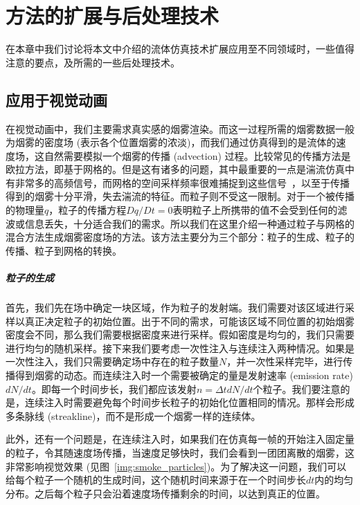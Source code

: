 \chapter{方法的扩展与后处理技术}
\label{chap:caa}

在本章中我们讨论将本文中介绍的流体仿真技术扩展应用至不同领域时，一些值得注意的要点，及所需的一些后处理技术。

\section{应用于视觉动画}
在视觉动画中，我们主要需求真实感的烟雾渲染。而这一过程所需的烟雾数据一般为烟雾的密度场 (表示各个位置烟雾的浓淡)，而我们通过仿真得到的是流体的速度场，这自然需要模拟一个烟雾的传播 (advection) 过程。比较常见的传播方法是欧拉方法，即基于网格的。但是这有诸多的问题，其中最重要的一点是湍流仿真中有非常多的高频信号，而网格的空间采样频率很难捕捉到这些信号~\cite{bridson2015fluid}，以至于传播得到的烟雾十分平滑，失去湍流的特征。而粒子则不受这一限制。对于一个被传播的物理量$q$，粒子的传播方程$Dq/Dt=0$表明粒子上所携带的值不会受到任何的滤波或信息丢失，十分适合我们的需求。所以我们在这里介绍一种通过粒子与网格的混合方法生成烟雾密度场的方法。该方法主要分为三个部分：粒子的生成、粒子的传播、粒子到网格的转换。

\paragraph{粒子的生成}
首先，我们先在场中确定一块区域，作为粒子的发射端。我们需要对该区域进行采样以真正决定粒子的初始位置。出于不同的需求，可能该区域不同位置的初始烟雾密度会不同，那么我们需要根据密度来进行采样。假如密度是均匀的，我们只需要进行均匀的随机采样。接下来我们要考虑一次性注入与连续注入两种情况。如果是一次性注入，我们只需要确定场中存在的粒子数量$N$，并一次性采样完毕，进行传播得到烟雾的动态。而连续注入时一个需要被确定的量是发射速率 (emission rate) $dN/dt$。即每一个时间步长，我们都应该发射$n=\Delta t dN/dt$个粒子。我们要注意的是，连续注入时需要避免每个时间步长粒子的初始化位置相同的情况。那样会形成多条脉线 (streakline)，而不是形成一个烟雾一样的连续体。

此外，还有一个问题是，在连续注入时，如果我们在仿真每一帧的开始注入固定量的粒子，令其随速度场传播，当速度足够快时，我们会看到一团团离散的烟雾，这非常影响视觉效果 (见图~\ref{img:smoke_particles})。为了解决这一问题，我们可以给每个粒子一个随机的生成时间，这个随机时间来源于在一个时间步长$dt$内的均匀分布。之后每个粒子只会沿着速度场传播剩余的时间，以达到真正的位置。

